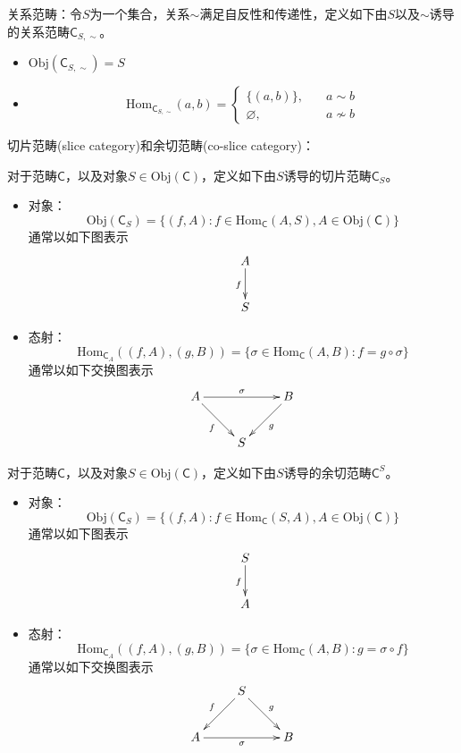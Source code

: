 \begin{example}
	关系范畴：令$S$为一个集合，关系$\sim$满足自反性和传递性，定义如下由$S$以及$\sim$诱导的关系范畴$\mathsf{C}_{S,\sim}$。
	\begin{itemize}
		\item $\mathrm{Obj}(\mathsf{C}_{S,\sim})=S$
		\item $$
		\mathrm{Hom}_{\mathsf{C}_{S,\sim}}(a,b)=\begin{cases}
			\{(a,b)\},\quad & a\sim b\\
			\varnothing,\quad & a\not\sim b
		\end{cases}
		$$
	\end{itemize}
\end{example}

\begin{example}
	切片范畴(slice category)和余切范畴(co-slice category)：
	
	对于范畴$\mathsf{C}$，以及对象$S\in\mathrm{Obj}(\mathsf{C})$，定义如下由$S$诱导的切片范畴$\mathsf{C}_S$。
	\begin{itemize}
		\item 对象：
		$$
		\mathrm{Obj}(\mathsf{C}_S)=\{ (f,A):f\in\mathrm{Hom}_\mathsf{C}(A,S),A\in\mathrm{Obj}(\mathsf{C}) \}
		$$
		通常以如下图表示
		$$
		\xymatrix{
			A\ar_f[d]\\
			S
		}
		$$
		\item 态射：
		$$
		\mathrm{Hom}_{\mathsf{C}_A}((f,A),(g,B))=\{ \sigma\in\mathrm{Hom}_\mathsf{C}(A,B):f=g\circ\sigma \}
		$$
		通常以如下交换图表示
		$$
		\xymatrix{
			A \ar[rr]^\sigma \ar[dr]_{f} & & B \ar[dl]^{g}\\
			&S
		}
		$$
	\end{itemize}

	对于范畴$\mathsf{C}$，以及对象$S\in\mathrm{Obj}(\mathsf{C})$，定义如下由$S$诱导的余切范畴$\mathsf{C}^S$。
	\begin{itemize}
		\item 对象：
		$$
		\mathrm{Obj}(\mathsf{C}_S)=\{ (f,A):f\in\mathrm{Hom}_\mathsf{C}(S,A),A\in\mathrm{Obj}(\mathsf{C}) \}
		$$
		通常以如下图表示
		$$
		\xymatrix{
			S\ar_f[d]\\
			A
		}
		$$
		\item 态射：
		$$
		\mathrm{Hom}_{\mathsf{C}_A}((f,A),(g,B))=\{ \sigma\in\mathrm{Hom}_\mathsf{C}(A,B):g=\sigma\circ f \}
		$$
		通常以如下交换图表示
		$$
		\xymatrix{
			&S\ar[dl]_{f} \ar[dr]^{g}&\\
			A \ar[rr]_\sigma  & & B 
		}
		$$
	\end{itemize}
\end{example}

